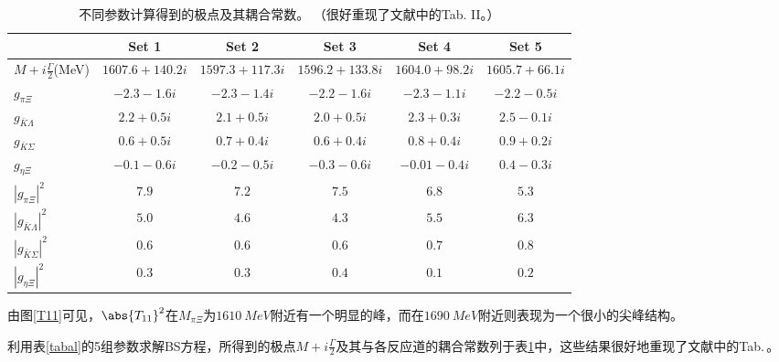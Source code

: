 \begin{table}[t]
\begin{spacing}{1.2}
\centering
\caption[$\pi \Xi$ 散射振幅的极点及其耦合常数]{\vadjust{\vspace{0.2pt}}不同参数计算得到的极点及其耦合常数。 （很好重现了文献\cite{PhysRevLett.89.252001}中的Tab. II。）}\label{tab:a2}
\begin{tabular*}{1.05\textwidth}{@{\extracolsep{\fill}}lccccc}
\toprule
\hline
                                     & Set 1           & Set 2            & Set 3           & Set 4          & Set 5 \\
\midrule
    $M\!+\!i \frac{\Gamma}{2}$(MeV)  & $1607.6+140.2i$ & $1597.3+117.3i$  & $1596.2+133.8i$ & $1604.0+98.2i$ & $1605.7+66.1i$  \\
    $g_{\pi \Xi}$                    & $-2.3-1.6i$   & $-2.3-1.4i$    & $-2.2-1.6i$   & $-2.3-1.1i$  & $-2.2-0.5i$      \\
    $g_{\bar K \Lambda}$             & $2.2+0.5i$    & $2.1+0.5i$     & $2.0+0.5i$    &$2.3+0.3i$    & $2.5-0.1i$      \\
     $g_{\bar K \Sigma}$             & $0.6+0.5i$    & $0.7+0.4i$     & $0.6+0.4i$    &$0.8+0.4i$    & $0.9+0.2i$      \\
     $g_{\eta \Xi}$                  & $-0.1-0.6i$   & $-0.2-0.5i$    & $-0.3-0.6i$   &$-0.01-0.4i$   & $0.4-0.3i$      \\
     $|g_{\pi \Xi}|^2$               & $7.9$          & $7.2$           & $7.5$          & $6.8$         & $5.3 $      \\
   $|g_{\bar K \Lambda}|^2$          & $5.0$          & $4.6$           & $4.3$          & $5.5$         & $6.3 $      \\
     $|g_{\bar K \Sigma}|^2$         & $0.6$          & $0.6$           & $0.6$          & $0.7$         & $0.8 $      \\
      $|g_{\eta \Xi}|^2$             & $0.3$          & $0.3$           & $0.4$          & $0.1$         & $0.2$      \\
  \hline
  \bottomrule
\end{tabular*}
\end{spacing}
\end{table}\par
由图\ref{T11}可见，$\abs{T_{11}}^2$在$M_{\pi\Xi}$为$\SI{1610}{MeV}$附近有一个明显的峰，而在$\SI{1690}{MeV}$附近则表现为一个很小的尖峰结构。\par
利用表\ref{tabal}的5组参数求解BS方程，所得到的极点$M+i\frac{\Gamma}{2}$及其与各反应道的耦合常数列于表\ref{tab:a2}中，这些结果很好地重现了文献\cite{PhysRevLett.89.252001}中的Tab.\,\uppercase\expandafter{}。
